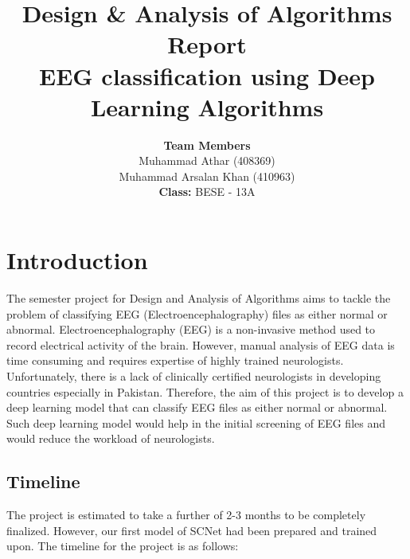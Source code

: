 \documentclass[10pt]{article}
\title{\textbf{Design \& Analysis of Algorithms Report \\ \vspace{5mm} EEG classification using Deep Learning Algorithms}}
\author{\textbf{Team Members} \vspace{1mm} \\ Muhammad Athar (408369) \\ Muhammad Arsalan Khan (410963) \vspace{5mm} \\ \textbf{Class: }BESE - 13A}
\begin{document}
\maketitle

\tableofcontents
\newpage

\justifying
\section{Introduction}
The semester project for Design and Analysis of Algorithms aims to tackle the problem of classifying EEG (Electroencephalography) files as either normal or abnormal.
Electroencephalography (EEG) is a non-invasive method used to record electrical activity of the brain. However, manual analysis of EEG data is time consuming and requires expertise of highly trained neurologists. Unfortunately, there is a lack of clinically certified neurologists in developing countries especially in Pakistan. Therefore, the aim of this project is to develop a deep learning model that can classify EEG files as either normal or abnormal. Such deep learning model would help in the initial screening of EEG files and would reduce the workload of neurologists.

\subsection{Timeline}
The project is estimated to take a further of 2-3 months to be completely finalized. However, our first model of SCNet had been prepared and trained upon.
The timeline for the project is as follows:

\begin{center}
\end{center}
\end{document}
